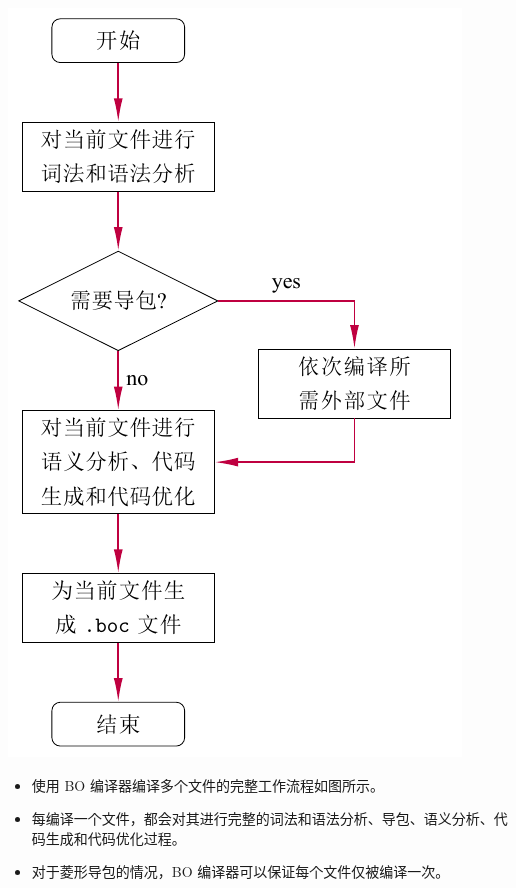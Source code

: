 \documentclass[dvipsnames, svgnames, x11names]{beamer}
\begin{document}
\begin{frame}
    \begin{center}
    \begin{minipage}{.4\linewidth}
        \includegraphics[height=\textheight]{../figure/flowChart.pdf}
    \end{minipage}
    \quad\quad
    \begin{minipage}{.45\linewidth}
        \begin{itemize}[<+->]
            \item 使用 BO 编译器编译多个文件的完整工作流程如图所示。
            \item 每编译一个文件，都会对其进行完整的词法和语法分析、导包、语义分析、代码生成和代码优化过程。
            \item 对于菱形导包的情况，BO 编译器可以保证每个文件仅被编译一次。
        \end{itemize}
    \end{minipage}
    \end{center}
\end{frame}
\end{document}
